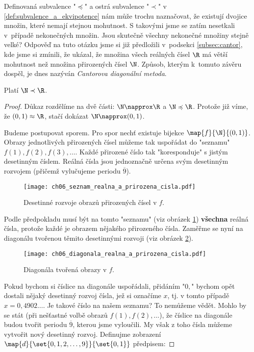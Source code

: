Definovaná subvalence "$\preccurlyeq$" a ostrá subvalence "$\prec$" v \ref{def:subvalence_a_ekvipotence} nám může trochu naznačovat, že existují dvojice množin, které nemají stejnou mohutnost. S takovými jsme se zatím nesetkali v~případě nekonečných množin. Jsou skutečně všechny nekonečné množiny stejně velké? Odpověď na tuto otázku jsme si již předložili v~podsekci \ref{subsec:cantor}, kde jsme si zmínili, že  ukázal, že množina všech reálných čísel $\R$ má větší mohutnost než množina přirozených čísel $\N$. Způsob, kterým k~tomuto závěru dospěl, je dnes nazýván \emph{Cantorova diagonální metoda}.
\begin{theorem}\label{thm:N_a_R}
    Platí $\N\prec\R$.
\end{theorem}
\begin{proof}
    Důkaz rozdělíme na dvě části: $\N\napprox\R$ a $\N\preccurlyeq\R$. Protože již víme, že $(0,1)\approx\R$, stačí dokázat $\N\napprox(0,1)$.\par
    Budeme postupovat sporem. Pro spor nechť existuje bijekce $\map{f}{\N}{(0,1)}$. Obrazy jednotlivých přirozených čísel můžeme tak uspořádat do "seznamu" $f(1),f(2),f(3),\dots$. Každé přirozené číslo tak "koresponduje" s jistým desetinným číslem. Reálná čísla jsou jednoznačně určena svým desetinným rozvojem (přičemž vylučujeme periodu $\overline{9}$).
    \begin{figure}[H]
        \centering
        \texttt{[image: ch06\_seznam\_realna\_a\_prirozena\_cisla.pdf]}
        \caption{Desetinné rozvoje obrazů přirozených čísel v $f$.}
        \label{fig:seznam_realna_a_prirozena_cisla}
    \end{figure}
    Podle předpokladu musí být na tomto "seznamu" (viz obrázek \ref{fig:seznam_realna_a_prirozena_cisla}) \textbf{všechna} reálná čísla, protože každé je obrazem nějakého přirozeného čísla. Zaměřme se nyní na diagonálu tvořenou těmito desetinnými rozvoji (viz obrázek \ref{fig:diagonala_realna_a_prirozena_cisla}).
    \begin{figure}[H]
        \centering
        \texttt{[image: ch06\_diagonala\_realna\_a\_prirozena\_cisla.pdf]}
        \caption{Diagonála tvořená obrazy v $f$.}
        \label{fig:diagonala_realna_a_prirozena_cisla}
    \end{figure}
    Pokud bychom si číslice na diagonále uspořádali, přidáním "$0,$" bychom opět dostali nějaký desetinný rozvoj čísla, jež si označíme $x$, tj. v tomto případě $x=0,4902\dots$. Je takové číslo na našem seznamu? To nemůžeme vědět. Mohlo by se stát (při nešťastné volbě obrazů $f(1),f(2),\dots$), že číslice na diagonále budou tvořit periodu $\overline{9}$, kterou jsme vyloučili. My však z toho čísla můžeme vytvořit nový desetinný rozvoj. Definujme zobrazení $\map{d}{\set{0,1,2,\dots,9}}{\set{0,1}}$ předpisem:

\end{proof}
